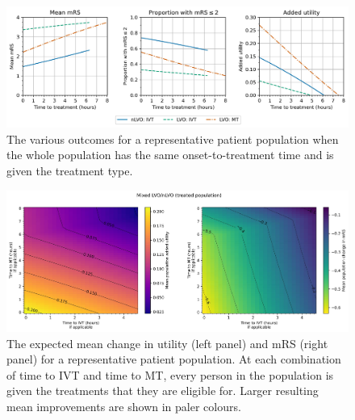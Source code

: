 \begin{figure}
    \centering
    \includegraphics[width=\columnwidth]{images/time_to_treatment.jpg}
    \caption{
        The various outcomes for a representative patient population when the whole population has the same onset-to-treatment time and is given the treatment type. 
        }
    \label{fig:changes_with_time}
\end{figure}


\begin{figure}
    \centering
    \includegraphics[width=\columnwidth]{images/matrix_utility_and_mRS.jpg}
    \caption{
        The expected mean change in utility (left panel) and mRS (right panel) for a representative patient population. At each combination of time to IVT and time to MT, every person in the population is given the treatments that they are eligible for. Larger resulting mean improvements are shown in paler colours.
        }
    \label{fig:matrix}
\end{figure}


